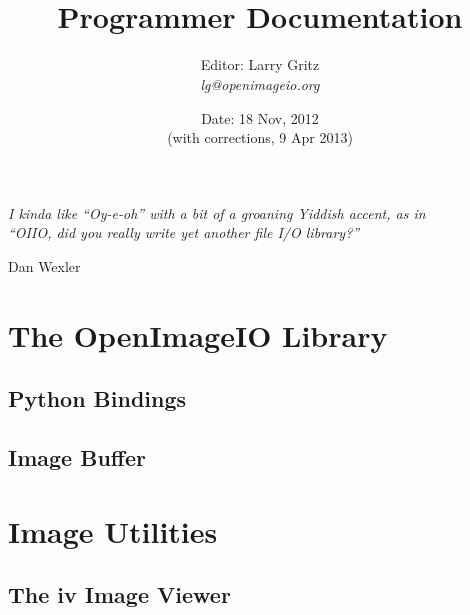 \documentclass[11pt,letterpaper]{book}
\title{ 
{\Huge{\bf \product}
{\bf\sffamily \versionnumber} \medskip \\ \huge Programmer Documentation
} \bigskip }
\author{Editor: Larry Gritz \\
\emph{lg@openimageio.org}
 \bigskip \\
}
\date{{\large 
Date: 18 Nov, 2012
\\ (with corrections, 9 Apr 2013)
}}
\begin{document}
\frontmatter

\maketitle

%

\vspace*{2in}

\begin{centering}
\emph{I kinda like ``Oy-e-oh'' with a bit of a groaning Yiddish accent, as in\\
``OIIO, did you really write yet another file I/O library?''} \\
\end{centering}
\medskip
\begin{centering}
\center Dan Wexler \\
\end{centering}




\setcounter{tocdepth}{1}
\tableofcontents

\mainmatter



\part{The OpenImageIO Library}









\chapter{Python Bindings}

\chapter{Image Buffer}

\part{Image Utilities}



\chapter{The {\kw iv} Image Viewer}
\label{chap:iv}
\end{document}
